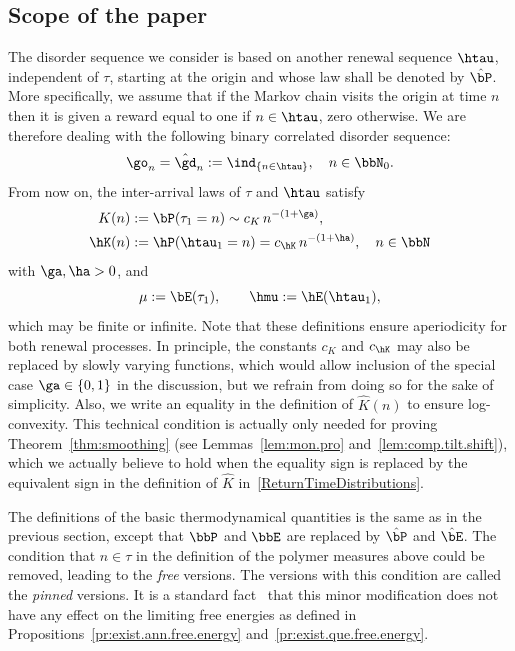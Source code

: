 \subsection{Scope of the paper}

The disorder sequence we consider is based on another renewal sequence $\htau$, independent of $\tau$, starting at the origin and whose law shall be denoted by $\hat\bP$. More specifically, we assume that if the Markov chain visits the origin at time $n$ then it is given a reward equal to one if $n \in \htau$, zero otherwise. We are therefore dealing with the following binary correlated disorder sequence:
\begin{equation}
\go_n = \hat\gd_n := \ind_{\{n \in \htau\}}, \quad n \in \bbN_0.
\end{equation}
From now on, the inter-arrival laws of $\tau$ and $\htau$ satisfy
\begin{equation}\label{ReturnTimeDistributions}
\begin{aligned}
K(n) &:= \bP(\tau_1 = n) \sim c_K \, n^{- (1 + \ga)},\\
\hK(n) &:= \hP(\htau_1 = n) = c_{\hK} \, n^{- (1 + \ha)}, \quad n \in \bbN
\end{aligned}
\end{equation}
with $\ga, \ha >0$, and
\begin{equation}
\mu := \bE(\tau_1),\qquad \hmu := \hE(\htau_1),
\end{equation}
which may be finite or infinite. Note that these definitions ensure aperiodicity for both renewal processes. In principle, the constants $c_K$ and $c_{\hK}$ may also be replaced by slowly varying functions, which would allow inclusion of the special case $\ga \in \{0,1\}$ in the discussion, but we refrain from doing so for the sake of simplicity. Also, we write an equality in the definition of $\hat K(n)$ to ensure log-convexity. This technical condition is actually only needed for proving Theorem~\ref{thm:smoothing} (see Lemmas~\ref{lem:mon.pro} and~\ref{lem:comp.tilt.shift}), which we actually believe to hold when the equality sign is replaced by the equivalent sign in the definition of $\hat K$ in~\eqref{ReturnTimeDistributions}.

The definitions of the basic thermodynamical quantities is the same as in the previous section, except that $\bbP$ and $\bbE$ are replaced by $\hat\bP$ and $\hat\bE$. The condition that $n \in \tau$ in the definition of the polymer measures above could be removed, leading to the \emph{free} versions. The versions with this condition are called the \emph{pinned} versions. It is a standard fact~\cite[Remark~1.2]{Gi2007} that this minor modification does not have any effect on the limiting free energies as defined in Propositions~\ref{pr:exist.ann.free.energy} and~\ref{pr:exist.que.free.energy}.

